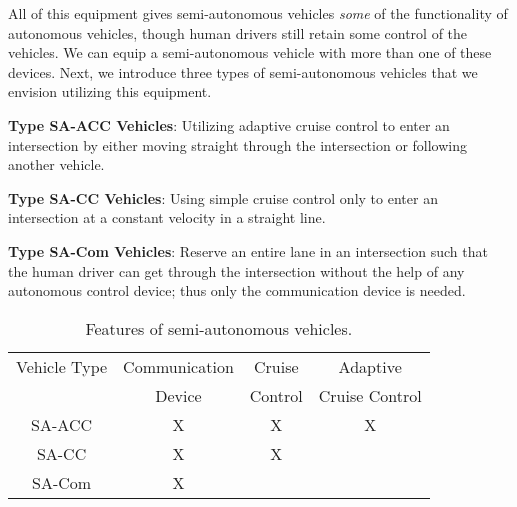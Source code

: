 All of this equipment gives semi-autonomous vehicles \emph{some} of
the functionality of autonomous vehicles, though human drivers still
retain some control of the vehicles.  We can equip a semi-autonomous
vehicle with more than one of these devices.  Next, we introduce three
types of semi-autonomous vehicles that we envision utilizing this
equipment.

\begin{small_ind_s_itemize}
\item \textbf{Type SA-ACC Vehicles}: Utilizing adaptive cruise
control to enter an intersection by either moving straight through the
intersection or following another vehicle.
\item \textbf{Type SA-CC Vehicles}: Using simple cruise control only
to enter an intersection at a constant velocity in a straight line.
\item \textbf{Type SA-Com Vehicles}: Reserve an entire lane in an
intersection such that the human driver can get through the
intersection without the help of any autonomous control device; thus
only the communication device is needed.
\end{small_ind_s_itemize}

\begin{table}
\centering
\caption{Features of semi-autonomous vehicles.}
\label{table:type}
\small
\begin{tabular}{|c|c|c|c|}
  \hline
  Vehicle Type & Communication & Cruise & Adaptive \\
               & Device & Control & Cruise Control \\
  \hline
  SA-ACC & X & X & X  \\
  \hline
  SA-CC & X & X &  \\
  \hline
  SA-Com & X & &  \\
  \hline
\end{tabular}
\vspace{-.25in}
\end{table}

